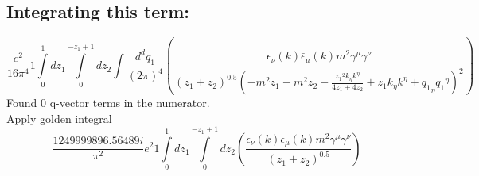 \subsection*{Integrating this term:}
\begin{dmath}\frac{e^{2}}{16 \pi^{4}}1\int\limits_{ 0 }^{ 1 } d{ z_{ 1 } }\int\limits_{ 0 }^{ - { z_{ 1 } } + 1 } d{ z_{ 2 } }\int\frac{d^d q_1 }{ (2\pi)^4 }\left(\frac{\epsilon_{ \nu }({ k }) \bar{\epsilon}_{ \mu }({ k }) m^{2} { \gamma^{ \mu } } { \gamma^{ \nu } }}{\left({ z_{ 1 } } + { z_{ 2 } }\right)^{0.5} \left(- m^{2} { z_{ 1 } } - m^{2} { z_{ 2 } } - \frac{{ z_{ 1 } }^{2} { { k }_{ \eta } } { { k }^{ \eta } }}{4 { z_{ 1 } } + 4 { z_{ 2 } }} + { z_{ 1 } } { { k }_{ \eta } } { { k }^{ \eta } } + { { q_1 }_{ \eta } } { { q_1 }^{ \eta } }\right)^{2}}\right)\end{dmath}
Found 0 q-vector terms in the numerator.\\
Apply golden integral
\begin{dmath}\frac{1249999896.56489 i}{\pi^{2}} e^{2}1\int\limits_{ 0 }^{ 1 } d{ z_{ 1 } }\int\limits_{ 0 }^{ - { z_{ 1 } } + 1 } d{ z_{ 2 } }\left(\frac{\epsilon_{ \nu }({ k }) \bar{\epsilon}_{ \mu }({ k }) m^{2} { \gamma^{ \mu } } { \gamma^{ \nu } }}{\left({ z_{ 1 } } + { z_{ 2 } }\right)^{0.5}}\right)\end{dmath}
